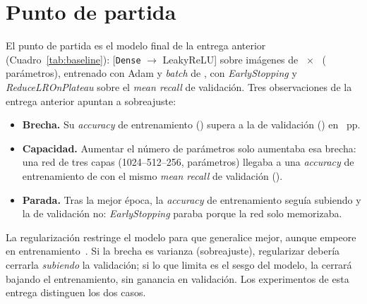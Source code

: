 \section{Punto de partida}
El punto de partida es el modelo final de la entrega anterior (Cuadro~\ref{tab:baseline}): 
[\texttt{Dense} $\rightarrow$ LeakyReLU] sobre imágenes de ~$\times$~
( parámetros), entrenado con Adam y \emph{batch} de , con \emph{EarlyStopping} y
\emph{ReduceLROnPlateau} sobre el \emph{mean recall} de validación. Tres observaciones de la entrega anterior apuntan
a sobreajuste:
\begin{itemize}
  \item \textbf{Brecha.} Su \emph{accuracy} de entrenamiento () supera a la de validación
  () en ~pp.
  \item \textbf{Capacidad.} Aumentar el número de parámetros solo aumentaba esa brecha: una red de tres capas
  (1024--512--256,  parámetros) llegaba a una \emph{accuracy} de entrenamiento de
   con el mismo \emph{mean recall} de validación ().
  \item \textbf{Parada.} Tras la mejor época, la \emph{accuracy} de entrenamiento seguía subiendo y la de validación
  no: \emph{EarlyStopping} paraba porque la red solo memorizaba.
\end{itemize}
La regularización restringe el modelo para que generalice mejor, aunque empeore en entrenamiento~\cite{goodfellow}.
Si la brecha es varianza (sobreajuste), regularizar debería cerrarla \emph{subiendo} la validación; si lo que limita es
el sesgo del modelo, la cerrará bajando el entrenamiento, sin ganancia en validación. Los experimentos de esta entrega
distinguen los dos casos.

\begin{table}[h]
  \centering
  \caption{Modelo de partida (final de la entrega 1) y sus métricas (media $\pm$ desviación típica de 
  semillas).}
  \label{tab:baseline}
\end{table}
